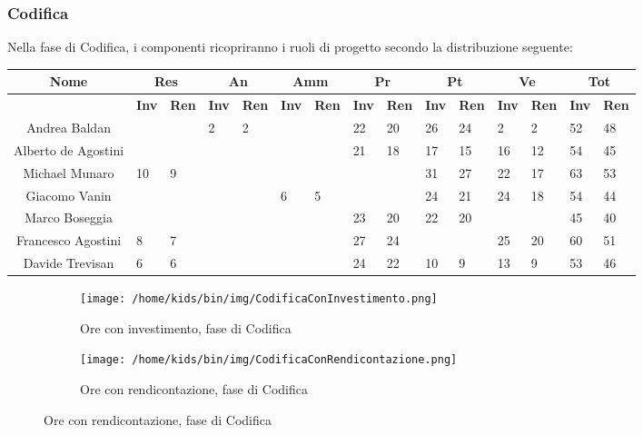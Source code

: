 \documentclass{scalatekids-article}
\begin{document}
\subsubsection{Codifica}
Nella fase di Codifica, i componenti ricopriranno i ruoli di progetto secondo la distribuzione seguente:
\begin{center}
  \scriptsize
  \begin{tabular}{| c | p{0.35cm}  p{0.35cm} | p{0.35cm}  p{0.35cm} | p{0.35cm}  p{0.35cm} | p{0.35cm}  p{0.35cm} | p{0.35cm}  p{0.35cm} | p{0.35cm}  p{0.35cm} | p{0.35cm}  p{0.35cm} |}
    \hline
    \textbf{Nome} & \multicolumn{2}{|c|}{\textbf{Res}} & \multicolumn{2}{|c|}{\textbf{An}} & \multicolumn{2}{|c|}{\textbf{Amm}} & \multicolumn{2}{|c|}{\textbf{Pr}} & \multicolumn{2}{|c|}{\textbf{Pt}} & \multicolumn{2}{|c|}{\textbf{Ve}} & \multicolumn{2}{|c|}{\textbf{Tot}}\\
    \hline
    & \textbf{Inv} & \textbf{Ren} & \textbf{Inv} & \textbf{Ren} & \textbf{Inv} & \textbf{Ren} & \textbf{Inv} & \textbf{Ren} & \textbf{Inv} & \textbf{Ren} & \textbf{Inv} & \textbf{Ren} & \textbf{Inv} & \textbf{Ren}\\
    \hline
    Andrea Baldan & & & 2 & 2 & & & 22 & 20 & 26 & 24 & 2 & 2 & 52 & 48\\
    Alberto de Agostini & & & & & & & 21 & 18 & 17 & 15 & 16 & 12 & 54 & 45\\
    Michael Munaro & 10 & 9 & & & & & & & 31 & 27 & 22 & 17 & 63 & 53\\
    Giacomo Vanin & & & & & 6 & 5 & & & 24 & 21 & 24 & 18 & 54 & 44\\
    Marco Boseggia & & & & & & & 23 & 20 & 22 & 20 & & & 45 & 40\\
    Francesco Agostini & 8 & 7 & & & & & 27 & 24 & & & 25 & 20 & 60 & 51\\
    Davide Trevisan & 6 & 6 & & & & & 24 & 22 & 10 & 9 & 13 & 9 & 53 & 46\\
    \hline
  \end{tabular}
\end{center}
\normalsize
\begin{figure}[H]
  \begin{subfigure}[H]{0.47\textwidth}
    \texttt{[image: /home/kids/bin/img/CodificaConInvestimento.png]}
    \caption{Ore con investimento, fase di Codifica}
  \end{subfigure}
  \qquad
  \begin{subfigure}[H]{0.47\textwidth}
    \texttt{[image: /home/kids/bin/img/CodificaConRendicontazione.png]}
    \caption{Ore con rendicontazione, fase di Codifica}
  \end{subfigure}
\end{figure}
\end{document}
